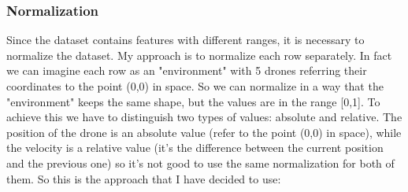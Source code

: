 \subsubsection{Normalization} \label{sec:preprocessing-normalization}
Since the dataset contains features with different ranges, it is necessary to normalize the dataset.
My approach is to normalize each row separately. In fact we can imagine each row as an "environment" with 5 drones referring their coordinates to the point (0,0) in space.
So we can normalize in a way that the "environment" keeps the same shape, but the values are in the range [0,1].
To achieve this we have to distinguish two types of values: absolute and relative.
The position of the drone is an absolute value (refer to the point (0,0) in space), while the velocity is a relative value (it's the difference between the current position and the previous one) so it's not good to use the same normalization for both of them.
So this is the approach that I have decided to use:
